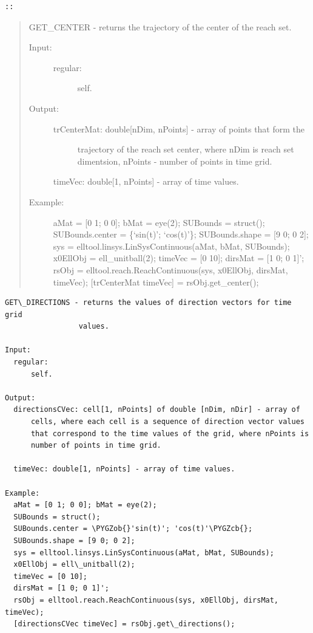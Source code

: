 \documentclass[letterpaper,10pt,english]{sphinxmanual}
\def\PYGZob{\char`\{}
\def\PYGZcb{\char`\}}
\begin{document}
\begin{Verbatim}[commandchars=\\\{\}]
::
\end{Verbatim}
\begin{quote}

GET\_CENTER - returns the trajectory of the center of the reach set.
\begin{description}
\item[{Input:}] \leavevmode\begin{description}
\item[{regular:}] \leavevmode
self.

\end{description}

\item[{Output:}] \leavevmode\begin{description}
\item[{trCenterMat: double{[}nDim, nPoints{]} - array of points that form the}] \leavevmode
trajectory of the reach set center, where nDim is reach set
dimentsion, nPoints - number of points in time grid.

\end{description}

timeVec: double{[}1, nPoints{]} - array of time values.

\item[{Example:}] \leavevmode
aMat = {[}0 1; 0 0{]}; bMat = eye(2);
SUBounds = struct();
SUBounds.center = \{`sin(t)'; `cos(t)'\};
SUBounds.shape = {[}9 0; 0 2{]};
sys = elltool.linsys.LinSysContinuous(aMat, bMat, SUBounds);
x0EllObj = ell\_unitball(2);
timeVec = {[}0 10{]};
dirsMat = {[}1 0; 0 1{]}';
rsObj = elltool.reach.ReachContinuous(sys, x0EllObj, dirsMat, timeVec);
{[}trCenterMat timeVec{]} = rsObj.get\_center();

\end{description}
\end{quote}

\begin{Verbatim}[commandchars=\\\{\}]
GET\_DIRECTIONS - returns the values of direction vectors for time grid
                 values.

Input:
  regular:
      self.

Output:
  directionsCVec: cell[1, nPoints] of double [nDim, nDir] - array of
      cells, where each cell is a sequence of direction vector values
      that correspond to the time values of the grid, where nPoints is
      number of points in time grid.

  timeVec: double[1, nPoints] - array of time values.

Example:
  aMat = [0 1; 0 0]; bMat = eye(2);
  SUBounds = struct();
  SUBounds.center = \PYGZob{}'sin(t)'; 'cos(t)'\PYGZcb{};
  SUBounds.shape = [9 0; 0 2];
  sys = elltool.linsys.LinSysContinuous(aMat, bMat, SUBounds);
  x0EllObj = ell\_unitball(2);
  timeVec = [0 10];
  dirsMat = [1 0; 0 1]';
  rsObj = elltool.reach.ReachContinuous(sys, x0EllObj, dirsMat, timeVec);
  [directionsCVec timeVec] = rsObj.get\_directions();
\end{Verbatim}
\end{document}
